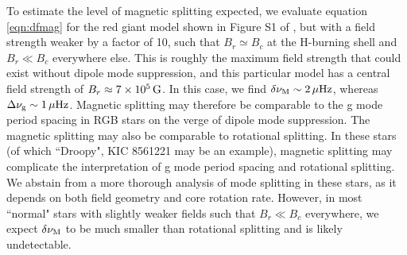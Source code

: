 To estimate the level of magnetic splitting expected, we evaluate equation \ref{eqn:dfmag} for the red giant model shown in Figure S1 of \cite{Fuller_2015}, but with a field strength weaker by a factor of 10, such that $B_r \simeq B_c$ at the H-burning shell and $B_r \ll B_c$ everywhere else. This is roughly the maximum field strength that could exist without dipole mode suppression, and this particular model has a central field strength of $B_r \approx 7 \times 10^5 \, {\rm G}$.  In this case, we find $\delta \nu_{\rm M} \sim 2 \, \mu {\rm Hz}$, whereas $\Delta \nu_{\rm g} \sim 1 \, \mu{\rm Hz}$. Magnetic splitting may therefore be comparable to the g mode period spacing in RGB stars on the verge of dipole mode suppression. The magnetic splitting may also be comparable to rotational splitting. In these stars (of which ``Droopy", KIC 8561221 \cite{Garcia_2014} may be an example), magnetic splitting may complicate the interpretation of g mode period spacing and rotational splitting. We abstain from a more thorough analysis of mode splitting in these stars, as it depends on both field geometry and core rotation rate. However, in most ``normal" stars with slightly weaker fields such that $B_r \ll B_c$ everywhere, we expect $\delta \nu_{\rm M}$ to be much smaller than rotational splitting and is likely undetectable. 




